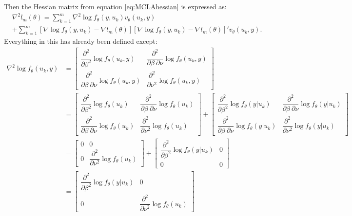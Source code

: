 \documentclass{article}
\begin{document}
Then the Hessian matrix from equation \ref{eq:MCLAhessian} is expressed as: 
\begin{align}
&\nabla^2 l_m(\theta)=  \sum_{k=1}^m  \nabla^2 \log f_\theta(y,u_k)   v_\theta(u_k,y) \label{eq:MCLAh} \\ 
&+   \sum_{k=1}^m \left[ \nabla \log f_\theta(y,u_k)  -
    \nabla l_m(\theta)   \right] \left[ \nabla \log f_\theta(y,u_k)  -\nabla l_m(\theta)  \right]'  v_\theta(u_k,y)   . \nonumber
\end{align}
Everything in this has already been defined except:
\begin{align}
\nabla^2 \log f_\theta (u_k,y) &=  \begin{bmatrix} \dfrac{\partial^2}{\partial \beta^2} \log f_\theta (u_k,y) & \dfrac{\partial^2}{\partial \beta \: \partial \nu} \log f_\theta (u_k,y) \\ \dfrac{\partial^2}{\partial \beta \: \partial \nu} \log f_\theta (u_k,y)  & \dfrac{\partial^2}{ \partial \nu^2} \log f_\theta (u_k,y)  \end{bmatrix} \\
&= \begin{bmatrix} \dfrac{\partial^2}{\partial \beta^2} \log f_\theta (u_k) & \dfrac{\partial^2}{\partial \beta \: \partial \nu} \log f_\theta (u_k) \\ \dfrac{\partial^2}{\partial \beta \: \partial \nu} \log f_\theta (u_k)  & \dfrac{\partial^2}{ \partial \nu^2} \log f_\theta (u_k)  \end{bmatrix} + 
\begin{bmatrix} \dfrac{\partial^2}{\partial \beta^2} \log f_\theta (y|u_k) & \dfrac{\partial^2}{\partial \beta \: \partial \nu} \log f_\theta (y|u_k) \\ \dfrac{\partial^2}{\partial \beta \: \partial \nu} \log f_\theta (y|u_k)  & \dfrac{\partial^2}{ \partial \nu^2} \log f_\theta (y|u_k)  \end{bmatrix} \\
&= \begin{bmatrix} 0 & 0 \\ 0  & \dfrac{\partial^2}{ \partial \nu^2} \log f_\theta (u_k)  \end{bmatrix} + 
\begin{bmatrix} \dfrac{\partial^2}{\partial \beta^2} \log f_\theta (y|u_k) & 0 \\ 0 & 0  \end{bmatrix} \\
&= \begin{bmatrix} \dfrac{\partial^2}{\partial \beta^2} \log f_\theta (y|u_k) & 0 \\ 0  & \dfrac{\partial^2}{ \partial \nu^2} \log f_\theta (u_k)  \end{bmatrix} 
\end{align}
\end{document}
